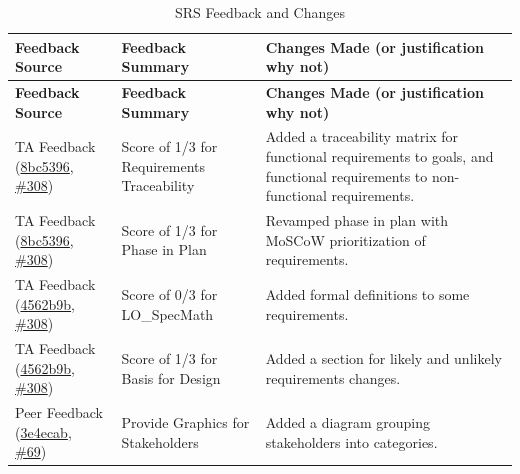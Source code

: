 \documentclass{article}
\begin{document}
\begin{longtable}{|>{\raggedright\arraybackslash}p{}|>{\raggedright\arraybackslash}p{}|>{\raggedright\arraybackslash}p{}|}
\caption{SRS Feedback and Changes}
\label{tab:feedback}\\
\hline
\textbf{Feedback Source} & \textbf{Feedback Summary} & \textbf{Changes Made (or justification why not)} \\
\hline
\endfirsthead

\hline
\textbf{Feedback Source} & \textbf{Feedback Summary} & \textbf{Changes Made (or justification why not)} \\
\hline
\endhead

\hline
\endfoot

\hline
\endlastfoot

TA Feedback (\href{https://github.com/VirochaanRG/MES-Event-Management-System/commit/8bc5396d775e0d0a8b8e15ddfbbb528015fec6d9}{8bc5396}, \href{https://github.com/VirochaanRG/MES-Event-Management-System/issues/308}{\#308}) & Score of 1/3 for Requirements Traceability & Added a traceability matrix for functional requirements to goals, and functional requirements to non-functional requirements.\\
\hline
TA Feedback (\href{https://github.com/VirochaanRG/MES-Event-Management-System/commit/8bc5396d775e0d0a8b8e15ddfbbb528015fec6d9}{8bc5396}, \href{https://github.com/VirochaanRG/MES-Event-Management-System/issues/308}{\#308}) & Score of 1/3 for Phase in Plan & Revamped phase in plan with MoSCoW prioritization of requirements.\\
\hline
TA Feedback (\href{https://github.com/VirochaanRG/MES-Event-Management-System/commit/4562b9b7bdc14277b1dbc1892145fdb986e851c5}{4562b9b}, \href{https://github.com/VirochaanRG/MES-Event-Management-System/issues/308}{\#308}) & Score of 0/3 for LO\_SpecMath & Added formal definitions to some requirements.\\
\hline
TA Feedback (\href{https://github.com/VirochaanRG/MES-Event-Management-System/commit/4562b9b7bdc14277b1dbc1892145fdb986e851c5}{4562b9b}, \href{https://github.com/VirochaanRG/MES-Event-Management-System/issues/308}{\#308}) & Score of 1/3 for Basis for Design & Added a section for likely and unlikely requirements changes.\\
\hline
Peer Feedback (\href{https://github.com/VirochaanRG/MES-Event-Management-System/commit/3e4ecabe6377527c3e0fbc0718594a280f19814a}{3e4ecab}, \href{https://github.com/VirochaanRG/MES-Event-Management-System/issues/69}{\#69}) & Provide Graphics for Stakeholders & Added a diagram grouping stakeholders into categories.\\

\end{longtable}
\end{document}
